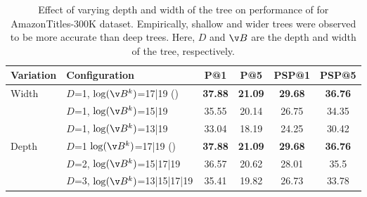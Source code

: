 \begin{table*}
\caption{Effect of varying depth and width of the tree on performance of \alg for AmazonTitles-300K dataset. Empirically, shallow and wider trees were observed to be more accurate than deep trees. Here, $D$ and $\v B$ are the depth and width of the tree, respectively.}
    \label{tab:sub:tree_sctruc}
    \centering
    \begin{tabular}{@{}l|l|cc|cc@{}}
    \toprule
    \textbf{Variation} & \textbf{Configuration} &\textbf{P@1} & \textbf{P@5} & \textbf{PSP@1} & \textbf{PSP@5} \\
    \midrule
\multirow{3}{*}{Width}& $D$=1, $\log(\v B^{k})$=17|19	(\alg) & \textbf{37.88}	 & \textbf{21.09}	 & \textbf{29.68}	 & \textbf{36.76}	 \\
& $D$=1, $\log(\v B^{k})$=15|19	 & 35.55	 & 20.14	 & 26.75	 & 34.35	 \\
& $D$=1, $\log(\v B^{k})$=13|19	 & 33.04	 & 18.19	 & 24.25	 & 30.42	 \\
\midrule
\multirow{3}{*}{Depth}& $D$=1 $\log(\v B^{k})$=17|19	(\alg) & \textbf{37.88}	 & \textbf{21.09}	 & \textbf{29.68}	 & \textbf{36.76}	 \\
& $D$=2, $\log(\v B^{k})$=15|17|19	 & 36.57	 & 20.62	 & 28.01	 & 35.5	 \\
& $D$=3, $\log(\v B^{k})$=13|15|17|19	 & 35.41	 & 19.82	 & 26.73	 & 33.78	 \\
    \bottomrule
    \end{tabular}
\end{table*}